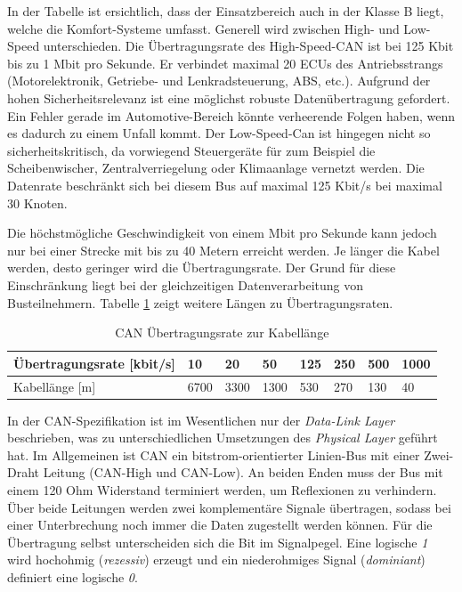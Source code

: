 In der Tabelle ist ersichtlich, dass der Einsatzbereich auch in der Klasse B liegt, welche die Komfort-Systeme umfasst. Generell wird zwischen High- und Low-Speed unterschieden. Die Übertragungsrate des High-Speed-CAN ist bei 125 Kbit bis zu 1 Mbit pro Sekunde. Er verbindet maximal 20 ECUs des Antriebsstrangs (Motorelektronik, Getriebe- und Lenkradsteuerung, ABS, etc.). Aufgrund der hohen Sicherheitsrelevanz ist eine möglichst robuste Datenübertragung gefordert. Ein Fehler gerade im Automotive-Bereich könnte verheerende Folgen haben, wenn es dadurch zu einem Unfall kommt. Der Low-Speed-Can ist hingegen nicht so sicherheitskritisch, da vorwiegend Steuergeräte für zum Beispiel die Scheibenwischer, Zentralverriegelung oder Klimaanlage vernetzt werden. Die Datenrate beschränkt sich bei diesem Bus auf maximal 125 Kbit/s bei maximal 30 Knoten.

Die höchstmögliche Geschwindigkeit von einem Mbit pro Sekunde kann jedoch nur bei einer Strecke mit bis zu 40 Metern erreicht werden. Je länger die Kabel werden, desto geringer wird die Übertragungsrate. Der Grund für diese Einschränkung liegt bei der gleichzeitigen Datenverarbeitung von Busteilnehmern. Tabelle \ref{tab:can_speed} zeigt weitere Längen zu Übertragungsraten.

\begin{table}[htbp]
	\centering
	\caption{CAN Übertragungsrate zur Kabellänge}
	\label{tab:can_speed}
	\begin{tabular}{|l|l l l l l l l|}
			\hline
			Übertragungsrate [kbit/s] & 10 & 20 & 50 & 125 & 250 & 500 & 1000 \\
			\hline
			Kabellänge [m] & 6700 & 3300 & 1300 & 530 & 270 & 130 & 40 \\
			\hline
\end{tabular}
\end{table}

In der CAN-Spezifikation ist im Wesentlichen nur der \textit{Data-Link Layer} beschrieben, was zu unterschiedlichen Umsetzungen des \textit{Physical Layer} geführt hat. Im Allgemeinen ist CAN ein bitstrom-orientierter Linien-Bus mit einer Zwei-Draht Leitung (CAN-High und CAN-Low). An beiden Enden muss der Bus mit einem 120 Ohm Widerstand terminiert werden, um Reflexionen zu verhindern.  Über beide Leitungen werden zwei komplementäre Signale übertragen, sodass bei einer Unterbrechung noch immer die Daten zugestellt werden können. Für die Übertragung selbst unterscheiden sich die Bit im Signalpegel. Eine logische \textit{1} wird hochohmig (\textit{rezessiv}) erzeugt und ein niederohmiges Signal (\textit{dominiant}) definiert eine logische \textit{0}.

